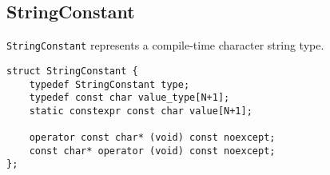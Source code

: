 \subsection{StringConstant}
\label{concept-StringConstant}

\texttt{StringConstant} represents a compile-time character string type. 

\begin{verbatim}
struct StringConstant {
	typedef StringConstant type;
	typedef const char value_type[N+1];
	static constexpr const char value[N+1];

	operator const char* (void) const noexcept;
	const char* operator (void) const noexcept;
};
\end{verbatim}
